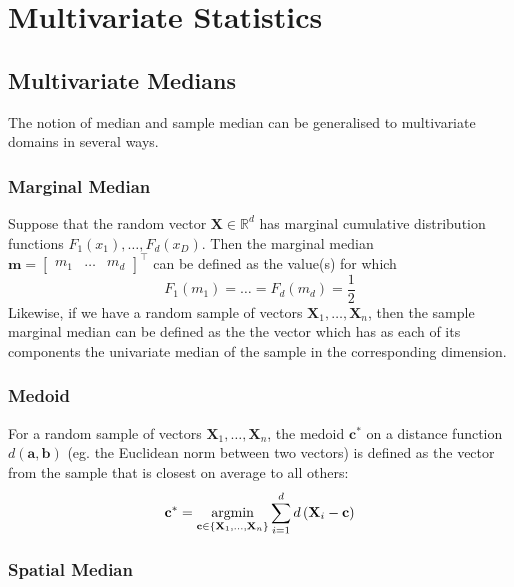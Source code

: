 \documentclass[11pt]{report} %
\begin{document}
\section{Multivariate Statistics}

\subsection{Multivariate Medians}

The notion of median and sample median can be generalised to multivariate domains in several ways.

\subsubsection{Marginal Median}

Suppose that the random vector $\mathbf{X} \in \mathbb{R}^{d}$ has marginal cumulative distribution functions $F_{1}\left(x_{1}\right), \dots, F_{d}\left(x_{D}\right)$. Then the marginal median $\mathbf{m} = \begin{bmatrix} m_{1} & \dots & m_{d}\end{bmatrix}^{\top}$ can be defined as the value(s) for which
\begin{equation}
F_{1}\left(m_{1}\right) = \dots = F_{d}\left(m_{d}\right) = \dfrac{1}{2}
\end{equation}
Likewise, if we have a random sample of vectors $\mathbf{X}_{1}, \dots, \mathbf{X}_{n}$, then the sample marginal median can be defined as the the vector which has as each of its components the univariate median of the sample in the corresponding dimension.

\subsubsection{Medoid}

For a random sample of vectors $\mathbf{X}_{1}, \dots, \mathbf{X}_{n}$, the medoid $\mathbf{c}^{*}$ on a distance function $d\left(\mathbf{a}, \mathbf{b}\right)$ (eg. the Euclidean norm between two vectors) is defined as the vector from the sample that is closest on average to all others:
\begin{equation}
\mathbf{c}^{*} = \operatorname*{argmin}_{\mathbf{c} \in \left\{\mathbf{X}_{1}, \dots, \mathbf{X}_{n}\right\}}\sum_{i = 1}^{d}d\left(\mathbf{X}_{i} - \mathbf{c}\right)
\end{equation}

\subsubsection{Spatial Median}
\end{document}
